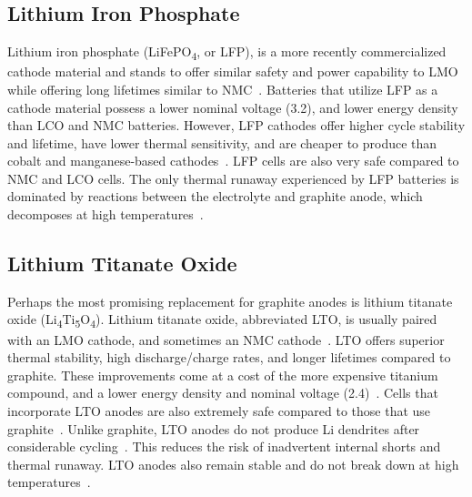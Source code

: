 \subsection{Lithium Iron Phosphate}
Lithium iron phosphate  (LiFePO\textsubscript{4}, or LFP), is a more recently commercialized cathode material and stands to offer similar safety and power capability to LMO while offering long lifetimes similar to NMC~\cite{preger2020degradation, nitta2015li}.
Batteries that utilize LFP as a cathode material possess a lower nominal voltage (3.2\ssi{\volt}), and lower energy density than LCO and NMC batteries. However, LFP 
cathodes offer higher cycle stability and lifetime, have lower thermal sensitivity, and are cheaper to produce than cobalt and manganese-based cathodes~\cite{doughty2012general,nitta2015li,preger2020degradation}. LFP cells are also very safe compared to NMC and LCO cells. The only thermal runaway experienced by LFP batteries is dominated by reactions between the electrolyte and graphite anode, which decomposes at high temperatures~\cite{doughty2012general}. 

\subsection{Lithium Titanate Oxide}
Perhaps the most promising replacement for graphite anodes is lithium titanate oxide (Li\textsubscript{4}Ti\textsubscript{5}O\textsubscript{4}).
Lithium titanate oxide, abbreviated LTO, is usually paired with an LMO cathode, and sometimes an NMC cathode~\cite{nitta2015li, belharouakElectrochemistry11, sandhya2014lithium}. LTO offers superior thermal stability, high discharge/charge rates, and longer lifetimes compared to graphite. These improvements come at a cost of the more expensive titanium compound, and a lower energy density and nominal voltage (2.4\ssi{\volt})~\cite{nitta2015li,sandhya2014lithium}. Cells that incorporate LTO anodes are also extremely safe compared to those that use graphite~\cite{nitta2015li, belharouakElectrochemistry11, sandhya2014lithium}. Unlike graphite, LTO anodes do not produce Li dendrites after considerable cycling~\cite{nitta2015li}. This reduces the risk of inadvertent internal shorts and thermal runaway. LTO anodes also remain stable and do not break down at high temperatures~\cite{belharouakElectrochemistry11}.


